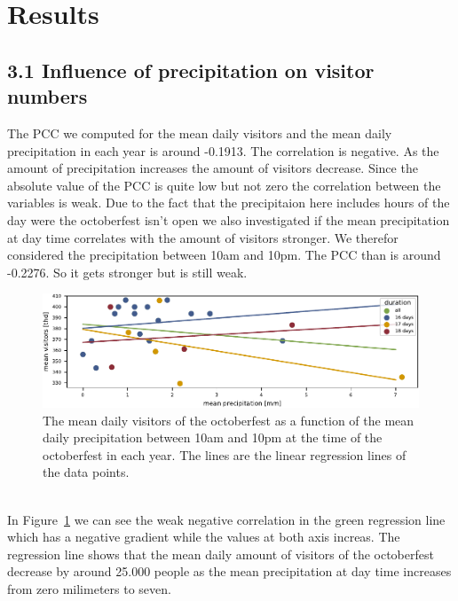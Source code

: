 \documentclass{article}
\theoremstyle{plain}
\theoremstyle{definition}
\theoremstyle{remark}
\begin{document}
\section{Results}\label{sec:results}
\subsection*{3.1 Influence of precipitation on visitor numbers}
The PCC we computed for the mean daily visitors and the mean daily precipitation in each year is around -0.1913. The correlation is negative. As the amount of precipitation increases the amount of visitors decrease. Since the absolute value of the PCC is quite low but not zero the correlation between the variables is weak. Due to the fact that the precipitaion here includes hours of the day were the octoberfest isn't open we also investigated if the mean precipitation at day time correlates with the amount of visitors stronger. We therefor considered the precipitation between 10am and 10pm. The PCC than is around -0.2276. So it gets stronger but is still weak.
\begin{figure}%
  \includegraphics{fig/totalprecipitation.pdf}
  \caption{The mean daily visitors of the octoberfest as a function of the mean daily precipitation between 10am and 10pm at the time of the octoberfest in each year. The lines are the linear regression lines of the data points.}
  \label{figure_precipitation}
\end{figure}\\
\noindent
In Figure~\ref{figure_precipitation} we can see the weak negative correlation in the green regression line which has a negative gradient while the values at both axis increas. The regression line shows that the mean daily amount of visitors of the octoberfest decrease by around 25.000 people as the mean precipitation at day time increases from zero milimeters to seven.\\
\end{document}

